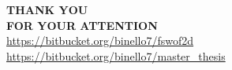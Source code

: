\documentclass[xcolor=dvipsnames, USenglish]{beamer}  %
\begin{document}
{
  \begin{frame}
    \centering
    \vspace{0.2cm}
    \huge{\textbf{THANK YOU\\FOR YOUR ATTENTION}}\\
    \small
    \vspace{0.7cm}
    \url{https://bitbucket.org/binello7/fswof2d}
    \vspace{0.4cm}
    \url{https://bitbucket.org/binello7/master\_thesis}
  \end{frame}
}
\end{document}
